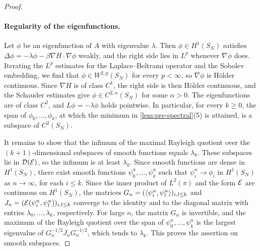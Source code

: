 \begin{proof}
\paragraph{Regularity of the eigenfunctions.} Let $\phi$ be an eigenfunction of $A$ with eigenvalue $\lambda$. Then $\phi\in H^1(S_N)$ satisfies $\Delta\phi=-\lambda\phi-\beta\nabla H\cdot\nabla\phi$ weakly, and the right side lies in $L^p$ whenever $\nabla\phi$ does. Iterating the $L^p$ estimates for the Laplace--Beltrami operator and the Sobolev embedding, we find that $\phi\in W^{2,p}(S_N)$ for every $p<\infty$, so $\nabla\phi$ is H\"older continuous. Since $\nabla H$ is of class $C^1$, the right side is then H\"older continuous, and the Schauder estimates give $\phi\in C^{2,\alpha}(S_N)$ for some $\alpha>0$. The eigenfunctions are of class $C^2$, and $L\phi=-\lambda\phi$ holds pointwise. In particular, for every $k\ge0$, the span of $\phi_0,\dots,\phi_k$, at which the minimum in \cref{lem:pre-spectral}(5) is attained, is a subspace of $C^2(S_N)$.

It remains to show that the infimum of the maximal Rayleigh quotient over the $(k+1)$-dimensional subspaces of smooth functions equals $\lambda_k$. These subspaces lie in $\mathcal D(\mathcal E)$, so the infimum is at least $\lambda_k$. Since smooth functions are dense in $H^1(S_N)$, there exist smooth functions $\psi^n_0,\dots,\psi^n_k$ such that $\psi^n_i\to\phi_i$ in $H^1(S_N)$ as $n\to\infty$, for each $i\le k$. Since the inner product of $L^2(\pi)$ and the form $\mathcal E$ are continuous on $H^1(S_N)$, the matrices $G_n=(\langle\psi^n_i,\psi^n_l\rangle)_{i,l\le k}$ and $J_n=(\mathcal E(\psi^n_i,\psi^n_l))_{i,l\le k}$ converge to the identity and to the diagonal matrix with entries $\lambda_0,\dots,\lambda_k$, respectively. For large $n$, the matrix $G_n$ is invertible, and the maximum of the Rayleigh quotient over the span of $\psi^n_0,\dots,\psi^n_k$ is the largest eigenvalue of $G_n^{-1/2}J_nG_n^{-1/2}$, which tends to $\lambda_k$. This proves the assertion on smooth subspaces.


\end{proof}
